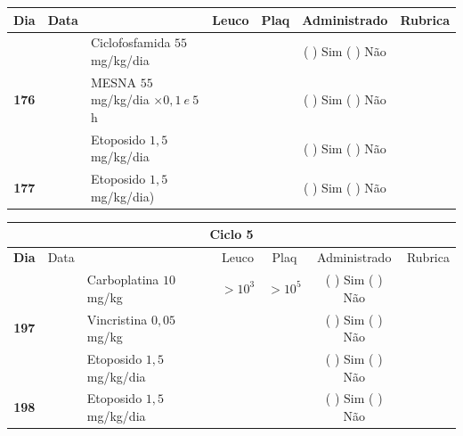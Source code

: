 \documentclass[11pt,a4paper,oldfontcommands]{memoir}
\begin{document}
\begin{center}
\begin{table}[H]
\begin{tabular}{p{1cm}c|p{4.8cm}|p{1.8cm}p{1.8cm}|c|c}
    \hline
\end{tabular}
\end{table}
\begin{table}[H] \small
\begin{tabular}{p{1cm}c|p{4.8cm}|p{1.8cm}p{1.8cm}|c|c}
	\hline
	\multicolumn{1}{c|}{\multirow{1}{*}{\textbf{Dia}}}&{Data}&{}&\multicolumn{1}{c|}{Leuco}&\multicolumn{1}{c|}{Plaq}&{Administrado}&{Rubrica} \\
    \hline
    \multicolumn{1}{c|}{\multirow{3}{*}{\textbf{176}}}&&{Ciclofosfamida \(55\) mg/kg/dia}&\multicolumn{1}{c|}{}&&{(  ) Sim (  ) Não}&\\
    \cline{4-5}
    \multicolumn{1}{c|}{}&&{MESNA \(55\) mg/kg/dia \(\times 0,1 \:e\: 5\)h}&&&{(  ) Sim (  ) Não}&\\
    \multicolumn{1}{c|}{}&&{Etoposido \(1,5\) mg/kg/dia}&&&{(  ) Sim (  ) Não}&\\
    \hline
    \multicolumn{1}{c|}{\multirow{1}{*}{\textbf{177}}}&&{Etoposido \(1,5\) mg/kg/dia)}&{}&&{(  ) Sim (  ) Não}&\\
    \hline
\end{tabular}
\end{table}
\begin{table}[H] \small
\begin{tabular}{p{1cm}c|p{4.8cm}|p{1.8cm}p{1.8cm}|c|c}
	\hline
	\multicolumn{7}{c}{Ciclo 5} \\
	\hline
	\multicolumn{1}{c|}{\multirow{1}{*}{\textbf{Dia}}}&{Data}&{}&\multicolumn{1}{c|}{Leuco}&\multicolumn{1}{c|}{Plaq}&{Administrado}&{Rubrica} \\
    \hline
    \multicolumn{1}{c|}{\multirow{3}{*}{\textbf{197}}}&\multirow{2}{*}{}&{Carboplatina \(10\) mg/kg}&\multicolumn{1}{c|}{\(>10^3\)}&\multicolumn{1}{c|}{\(>10^5\)}&{(  ) Sim (  ) Não}&\\
    \cline{4-5}
    \multicolumn{1}{c|}{}&&{Vincristina \(0,05\) mg/kg}&\multicolumn{1}{c|}{}&&{(  ) Sim (  ) Não}&\\
    \cline{4-5}
    \multicolumn{1}{c|}{}&\multirow{1}{*}{}&{Etoposido \(1,5\) mg/kg/dia}&{}&&{(  ) Sim (  ) Não}&\\
    \cline{1-3}\cline{6-6}
    \multicolumn{1}{c|}{\textbf{198}}&\multirow{1}{*}{}&{Etoposido \(1,5\) mg/kg/dia}&{}&&{(  ) Sim (  ) Não}&\\
    \hline
\end{tabular}
\end{table}
\begin{table}[H] \small
\begin{tabular}{p{1cm}c|p{4.8cm}|p{1.8cm}p{1.8cm}|c|c}

\end{tabular}
\end{table}
\end{center}
\end{document}
